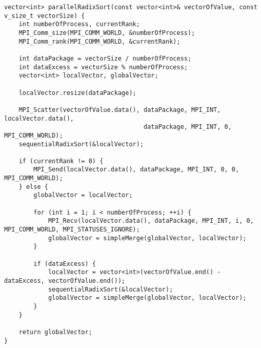 \documentclass{report}
\begin{document}
\begin{lstlisting}
vector<int> parallelRadixSort(const vector<int>& vectorOfValue, const v_size_t vectorSize) {
    int numberOfProcess, currentRank;
    MPI_Comm_size(MPI_COMM_WORLD, &numberOfProcess);
    MPI_Comm_rank(MPI_COMM_WORLD, &currentRank);

    int dataPackage = vectorSize / numberOfProcess;
    int dataExcess = vectorSize % numberOfProcess;
    vector<int> localVector, globalVector;

    localVector.resize(dataPackage);

    MPI_Scatter(vectorOfValue.data(), dataPackage, MPI_INT, localVector.data(),
                                      dataPackage, MPI_INT, 0, MPI_COMM_WORLD);
    sequentialRadixSort(&localVector);

    if (currentRank != 0) {
        MPI_Send(localVector.data(), dataPackage, MPI_INT, 0, 0, MPI_COMM_WORLD);
    } else {
        globalVector = localVector;

        for (int i = 1; i < numberOfProcess; ++i) {
            MPI_Recv(localVector.data(), dataPackage, MPI_INT, i, 0, MPI_COMM_WORLD, MPI_STATUSES_IGNORE);
            globalVector = simpleMerge(globalVector, localVector);
        }

        if (dataExcess) {
            localVector = vector<int>(vectorOfValue.end() - dataExcess, vectorOfValue.end());
            sequentialRadixSort(&localVector);
            globalVector = simpleMerge(globalVector, localVector);
        }
    }

    return globalVector;
}
\end{lstlisting}
\end{document}

